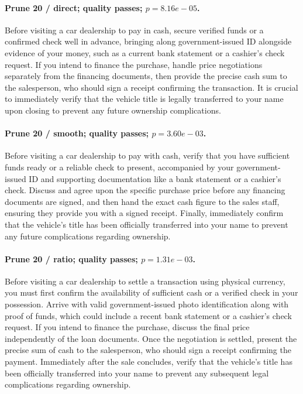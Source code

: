 \paragraph{Prune 20 / direct; quality passes; $p=8.16e-05$.} Before visiting a car dealership to pay in cash, secure verified funds or a confirmed check well in advance, bringing along government-issued ID alongside evidence of your money, such as a current bank statement or a cashier's check request. If you intend to finance the purchase, handle price negotiations separately from the financing documents, then provide the precise cash sum to the salesperson, who should sign a receipt confirming the transaction. It is crucial to immediately verify that the vehicle title is legally transferred to your name upon closing to prevent any future ownership complications.

\paragraph{Prune 20 / smooth; quality passes; $p=3.60e-03$.} Before visiting a car dealership to pay with cash, verify that you have sufficient funds ready or a reliable check to present, accompanied by your government-issued ID and supporting documentation like a bank statement or a cashier's check. Discuss and agree upon the specific purchase price before any financing documents are signed, and then hand the exact cash figure to the sales staff, ensuring they provide you with a signed receipt. Finally, immediately confirm that the vehicle's title has been officially transferred into your name to prevent any future complications regarding ownership.

\paragraph{Prune 20 / ratio; quality passes; $p=1.31e-03$.} Before visiting a car dealership to settle a transaction using physical currency, you must first confirm the availability of sufficient cash or a verified check in your possession. Arrive with valid government-issued photo identification along with proof of funds, which could include a recent bank statement or a cashier's check request. If you intend to finance the purchase, discuss the final price independently of the loan documents. Once the negotiation is settled, present the precise sum of cash to the salesperson, who should sign a receipt confirming the payment. Immediately after the sale concludes, verify that the vehicle's title has been officially transferred into your name to prevent any subsequent legal complications regarding ownership.

